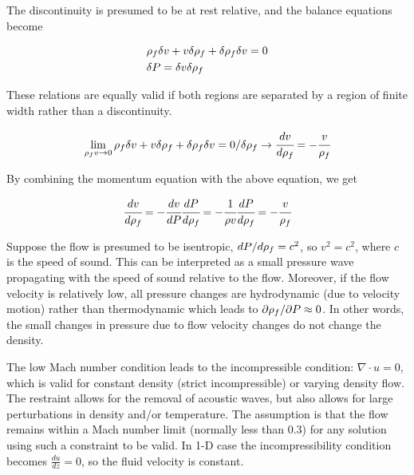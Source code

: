 \documentclass[a4paper,fleqn]{cas-dc}
\begin{document}
The discontinuity is presumed to be at rest relative, and the balance equations become		

{\footnotesize
	\begin{align*}
		&{\color{black}\rho_f} \delta v + v \delta {\color{black}\rho_f} + \delta {\color{black}\rho_f} \delta v = 0 \\
		&\delta {\color{black}P} = \delta v \delta {\color{black}\rho_f}
	\end{align*}
}

These relations are equally valid if both regions are separated by a region of finite width rather than a discontinuity. 

{\footnotesize
	\begin{equation*}
		\lim_{{\color{black}\rho_f} v \rightarrow 0} {\color{black}\rho_f} \delta v + v \delta {\color{black}\rho_f} + \delta {\color{black}\rho_f} \delta v = 0 / \delta {\color{black}\rho_f} \rightarrow \cfrac{d v}{d {\color{black}\rho_f}} = - \cfrac{v}{{\color{black}\rho_f}}
	\end{equation*}
}

By combining the momentum equation with the above equation, we get

{\footnotesize
	\begin{equation} \label{EQ: Pressure_Velocity}
		\cfrac{d v}{d {\color{black}\rho_f}} = - \cfrac{d v}{d{\color{black}P}} \cfrac{d {\color{black}P}}{d {\color{black}\rho_f}} = -\cfrac{1}{\rho v} \cfrac{d{\color{black}P}}{d{\color{black}\rho_f}} = -\cfrac{v}{{\color{black}\rho_f}}
	\end{equation}
}

Suppose the flow is presumed to be isentropic, $d{\color{black}P}/d{\color{black}\rho_f} = c^2$, so $v^2=c^2$, where $c$ is the speed of sound. This can be interpreted as a small pressure wave propagating with the speed of sound relative to the flow. Moreover, if the flow velocity is relatively low, all pressure changes are hydrodynamic (due to velocity motion) rather than thermodynamic which leads to $\partial {\color{black}\rho_f} / \partial {\color{black}P} \approx 0$. In other words, the small changes in pressure due to flow velocity changes do not change the density. 

The low Mach number condition leads to the incompressible condition: $\nabla \cdot u =0$, which is valid for constant density (strict incompressible) or varying density flow. The restraint allows for the removal of acoustic waves, but also allows for large perturbations in density and/or temperature. The assumption is that the flow remains within a Mach number limit (normally less than 0.3) for any solution using such a constraint to be valid. In 1-D case the incompressibility condition becomes $\frac{du}{dz} = 0$, so the fluid velocity is constant.
\end{document}
